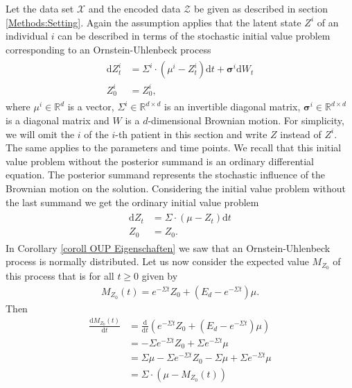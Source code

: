 \documentclass[11pt,titlepage]{article}
\newcommand{\R}{\mathbb{R}} %
\theoremstyle{definition}
\theoremstyle{remark}
\begin{document}
	Let the data set $\mathcal{X}$ and the encoded data $\mathcal{Z}$ be given as described in section \ref{Methods:Setting}. Again the assumption applies that the latent state $Z^i$ of an individual $i$ can be described in terms of the stochastic initial value problem corresponding to an Ornstein-Uhlenbeck process
	\begin{align*}
		\begin{split} 
			\mathrm{d}Z_t^i &= \Sigma^i \cdot (\mu^i- Z_t^i)\mathrm{d}t +\boldsymbol{\sigma}^i \mathrm{d}W_t\\
			Z^i_0 &= Z^i_0, 
		\end{split} 
	\end{align*}
	where $\mu^i\in\R^d$ is a vector, $\Sigma^i\in\R^{d\times d}$ is an invertible diagonal matrix, $\boldsymbol{\sigma}^i\in\R^{d\times d}$ is a diagonal matrix and $W$ is a $d$-dimensional Brownian motion. For simplicity, we will omit the $i$ of the $i$-th patient in this section and write $Z$ instead of $Z^i$. The same applies to the parameters and time points. We recall that this initial value problem without the posterior summand is an ordinary differential equation. The posterior summand represents the stochastic influence of the Brownian motion on the solution. Considering the initial value problem without the last summand we get the ordinary initial value problem
	\begin{align*}
		\begin{split} 
			\mathrm{d}Z_t &= \Sigma \cdot (\mu- Z_t)\mathrm{d}t\\
			Z_0 &= Z_0. 
		\end{split} 
	\end{align*}
	In Corollary \ref{coroll OUP Eigenschaften} we saw that an Ornstein-Uhlenbeck process is normally distributed. Let us now consider the expected value $M_{Z_0}$ of this process that is for all $t\geq 0$ given by
	\begin{align*}
		M_{Z_0}(t) = e^{-\Sigma t}Z_0 +(E_d-e^{-\Sigma t})\mu.
	\end{align*}
	Then
	\begin{align*}
		\frac{\mathrm{d} M_{Z_0}(t)}{\mathrm{d}t}&= \frac{\mathrm{d}}{\mathrm{d}t}\left(e^{-\Sigma t}Z_0 + (E_d -e^{-\Sigma t})\mu\right)\\
		&=-\Sigma e^{-\Sigma t}Z_0 + \Sigma e^{-\Sigma t}\mu\\
		&=\Sigma \mu -\Sigma e^{-\Sigma t}Z_0 -\Sigma \mu +\Sigma e^{-\Sigma t}\mu\\
		&=\Sigma \cdot (\mu - M_{Z_0}(t))
	\end{align*}
\end{document}
